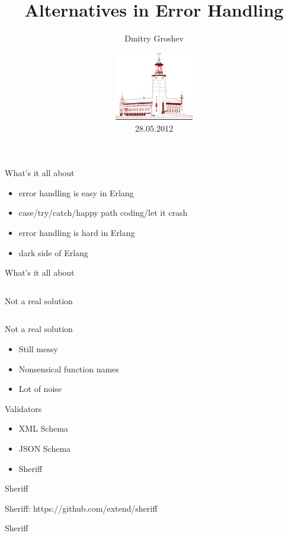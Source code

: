 \documentclass[10pt]{beamer}
\title[Об ошибках]{Alternatives in Error Handling}
\author{Dmitry Groshev}
\date{\includegraphics[height=3cm]{stadshuset-townhall2}\\28.05.2012}
\institute{Erlang User Conference 2012}
\newcommand{\code}[4]{\inputminted[linenos, frame=none, firstline=#2, lastline=#3,
  framesep=10pt, bgcolor=lightgray]{#4}{#1}}
\begin{document}
\begin{frame}
\titlepage
\end{frame}

\begin{frame}{What's it all about}
  \begin{itemize}
  \item error handling is easy in Erlang
  \item case/try/catch/happy path coding/let it crash
  \item error handling is hard in Erlang
  \item dark side of Erlang
  \end{itemize}
\end{frame}

\begin{frame}{What's it all about}
  \begin{center}
    \code{code.erl}{1}{17}{erlang}
  \end{center}
\end{frame}

\begin{frame}{Not a real solution}
  \code{code.erl}{19}{29}{erlang}
\end{frame}

\begin{frame}{Not a real solution}
  \begin{itemize}
  \item Still messy
  \item Nonsensical function names
  \item Lot of noise
  \end{itemize}
\end{frame}

\begin{frame}{Validators}
  \begin{itemize}
  \item XML Schema
  \item JSON Schema
  \item Sheriff
  \end{itemize}
\end{frame}

\begin{frame}{Sheriff}
  \begin{center}
    \Large
    Sheriff: https://github.com/extend/sheriff
  \end{center}
\end{frame}

\begin{frame}{Sheriff}
  \code{code.erl}{31}{37}{erlang}
\end{frame}
\end{document}
